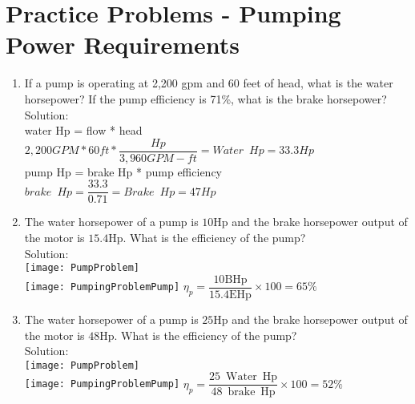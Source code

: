 \section*{Practice Problems - Pumping Power Requirements} 
\begin{enumerate}

\item If a pump is operating at 2,200 gpm and 60 feet of head, what is the water horsepower? If the pump efficiency is 71\%, what is the brake horsepower?\\
\vspace{0.2cm}
Solution:\\
\vspace{0.2cm}
water Hp = flow * head\\
$2,200GPM*60ft*\dfrac{Hp}{3,960 GPM-ft}=\boxed{Water \enspace Hp = 33.3Hp}$\\
\vspace{0.4cm}
pump Hp = brake Hp * pump efficiency\\
$brake \enspace Hp = \dfrac{33.3}{0.71}=\boxed{Brake \enspace Hp=47Hp}$
 \vspace{0.2cm}


\item The water horsepower of a pump is $10 \mathrm{Hp}$ and the brake horsepower output of the motor is $15.4 \mathrm{Hp}$. What is the efficiency of the pump?\\
\vspace{0.2cm}
Solution:\\ 
 \vspace{0.2cm}
 \vspace{0.4cm}\texttt{[image: PumpProblem]}\\
 \vspace{0.2cm}
 \texttt{[image: PumpingProblemPump]}
 $\eta_p=\dfrac{10 \mathrm{BHp}}{15.4 \mathrm{EHp}} \times 100=\boxed{65 \%}$\\
 \vspace{0.2cm}
 
 \item The water horsepower of a pump is $25 \mathrm{Hp}$ and the brake horsepower output of the motor is $48 \mathrm{Hp}$. What is the efficiency of the pump?\\
 Solution:\\
  \vspace{0.2cm}
 \vspace{0.32cm}\texttt{[image: PumpProblem]}\\
 \vspace{0.2cm}
 \texttt{[image: PumpingProblemPump]}
 \vspace{0.2cm}
$\eta_p=\dfrac{25 \mathrm{\enspace Water \enspace Hp}}{48 \mathrm{\enspace brake \enspace Hp}} \times 100=\boxed{52 \%}$
  \vspace{0.4cm}


\end{enumerate}
